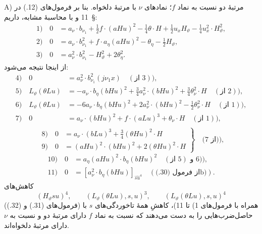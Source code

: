 \documentclass[11pt]{article}
\begin{document}
A) مرتبهٔ دو نسبت به نماد $f$؛ نمادهای $\nu$ با مرتبهٔ دلخواه. بنا بر فرمول‌های (12.) در \S\ 11 و با محاسبهٔ مشابه، داریم:
\begin{align*}
1)\quad 0&=a_\nu\cdot b_{\nu_1}+\frac12f\cdot(aHu)^2-\frac14\theta\cdot H+\frac12u_xH_\vartheta-\frac14u_x^2\cdot H_\vartheta^2,\\
2)\quad 0&=a_\nu\cdot b_{\nu_1}^2+f\cdot a_\eta(aHu)^2-\theta_\eta-\frac12H_\vartheta,\\
3)\quad 0&=a_\nu^2\cdot b_{\nu_1}^2-H_\vartheta^2+2\theta_\eta^2.
\end{align*}
از اینجا نتیجه می‌شود:
\begin{align*}
4)\quad 0&=a_\nu^2\cdot b_{\nu_1}^2(j\nu_1x)\quad(\text{از }3)),\\
5)\quad L_\vartheta(\theta Lu)&=-a_\nu\cdot b_\eta(bHu)^2+\frac34a_\nu^2\cdot(bHu)^2+\frac34\theta_\nu^2\cdot H\quad(\text{از }2)),\\
6)\quad L_\vartheta(\theta Lu)&=-6a_\nu\cdot b_\eta(bHu)^2+2a_\nu^2\cdot(bHu)^2-\frac12\theta_\nu^2\cdot H\quad(\text{از }1)),\\
7)\quad 0&=a_\nu\cdot(bHu)^2+f\cdot(aLu)^3+\theta_\nu\cdot H\quad(\text{از }1)),\\
\end{align*}
\[
\left.
\begin{aligned}
8)\quad 0&=a_\nu\cdot(bLu)^3+\frac34(\theta Hu)^2\cdot H\\
9)\quad 0&=(aHu)^2\cdot(bHu)^2+2(\theta Hu)^2\cdot H
\end{aligned}
\right\}\quad\text{(از 7)),}
\]
\begin{align*}
10)\quad 0&=a_\eta(aHu)^2\cdot b_\eta(bHu)^2\quad(\text{از }5)\text{ و }6)),\\
11)\quad 0&= [a_\nu^2\cdot b_\eta(bHu)]_{\widehat{su}^4}\quad(\text{از فرمول (30.)b)}).
\end{align*}
کاهش‌های
\[
(H_\vartheta su)^4,
\qquad (L_\vartheta(\theta Lu),s,u)^3,
\qquad (L_\vartheta(\theta Lu),s,u)^4
\]
(فرمول‌های (31.) و (32.)) همراه با فرمول‌های 1) تا 11)، کاهشِ همهٔ تاخوردگی‌های $s$ با حاصل‌ضرب‌هایی را به دست می‌دهند که نسبت به نماد $f$ دارای مرتبهٔ دو و نسبت به $\nu$ دارای مرتبهٔ دلخواه‌اند.
\end{document}
